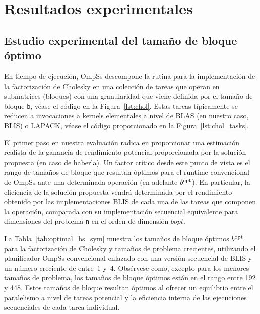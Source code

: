 
\section{Resultados experimentales}

\subsection{Estudio experimental del tamaño de bloque óptimo}

En tiempo de ejecución, OmpSs descompone la rutina para la implementación de la factorización de Cholesky en una colección de tareas
que operan en submatrices (bloques) con una granularidad que viene definida por el tamaño de bloque {\tt b}, véase el código en la 
Figura~\ref{lst:chol}. Estas tareas típicamente se reducen a invocaciones a kernels elementales a nivel de BLAS (en nuestro caso,
BLIS) o LAPACK, véase el código proporcionado en la Figura~\ref{lst:chol_tasks}.  

\newcommand{\bopt}{b^{\mbox{\rm \scriptsize opt}}\xspace}

El primer paso en nuestra evaluación radica en proporcionar una estimación realista de la ganancia de rendimiento
potencial proporcionada por la solución propuesta (en caso de haberla). Un factor crítico desde este punto de vista es
el rango de tamaños de bloque que resultan óptimos para el runtime convencional de OmpSs ante una determinada operación
(en adelante $\bopt$). En particular, la eficiencia de la solución propuesta vendrá determinada por el rendimiento obtenido
por las implementaciones BLIS de cada una de las tareas que componen la operación, comparada con su implementación secuencial
equivalente para dimensiones del problema {\tt n} en el orden de dimensión $bopt$.

La Tabla~\ref{tab:optimal_bs_sym} muestra los tamaños de bloque óptimos $\bopt$ para la factorización de Cholesky y tamaños
de problema crecientes, utilizando el planificador OmpSs convencional enlazado con una versión secuencial de BLIS y un número
creciente de \wts entre~1 y~4. Obsérvese como, excepto para los menores tamaños de problema, los tamaños de bloque óptimos están
en el rango entre 192 y 448. Estos tamaños de bloque resultan óptimos al ofrecer un equilibrio entre el paralelismo a nivel de tareas
potencial y la eficiencia interna de las ejecuciones secuenciales de cada tarea individual.


